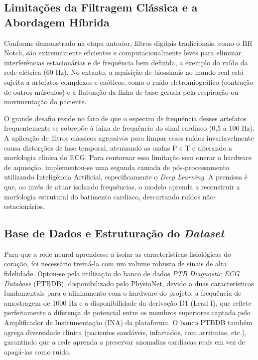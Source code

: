 \documentclass[tcc,capa]{texufpel}
\begin{document}
\subsection{Limitações da Filtragem Clássica e a Abordagem Híbrida}

Conforme demonstrado na etapa anterior, filtros digitais tradicionais, como o IIR Notch, são extremamente eficientes e computacionalmente leves para eliminar interferências estacionárias e de frequência bem definida, a exemplo do ruído da rede elétrica (60 Hz). No entanto, a aquisição de biossinais no mundo real está sujeita a artefatos complexos e caóticos, como o ruído eletromiográfico (contração de outros músculos) e a flutuação da linha de base gerada pela respiração ou movimentação do paciente. 

O grande desafio reside no fato de que o espectro de frequência desses artefatos frequentemente se sobrepõe à faixa de frequência do sinal cardíaco (0,5 a 100 Hz). A aplicação de filtros clássicos agressivos para limpar esses ruídos invariavelmente causa distorções de fase temporal, atenuando as ondas P e T e alterando a morfologia clínica do ECG. Para contornar essa limitação sem onerar o hardware de aquisição, implementou-se uma segunda camada de pós-processamento utilizando Inteligência Artificial, especificamente o \textit{Deep Learning}. A premissa é que, ao invés de atuar isolando frequências, o modelo aprenda a reconstruir a morfologia estrutural do batimento cardíaco, descartando ruídos não-estacionários.

\subsection{Base de Dados e Estruturação do \textit{Dataset}}

Para que a rede neural aprendesse a isolar as características fisiológicas do coração, foi necessário treiná-la com um volume robusto de sinais de alta fidelidade. Optou-se pela utilização do banco de dados \textit{PTB Diagnostic ECG Database} (PTBDB), disponibilizado pelo PhysioNet, devido a duas características fundamentais para o alinhamento com o hardware do projeto: a frequência de amostragem de 1000 Hz e a disponibilidade da derivação D1 (Lead I), que reflete perfeitamente a diferença de potencial entre os membros superiores captada pelo Amplificador de Instrumentação (INA) da plataforma. O banco PTBDB também agrega diversidade clínica (pacientes saudáveis, infartados, com arritmias, etc.), garantindo que a rede aprenda a preservar anomalias cardíacas reais em vez de apagá-las como ruído.
\end{document}
